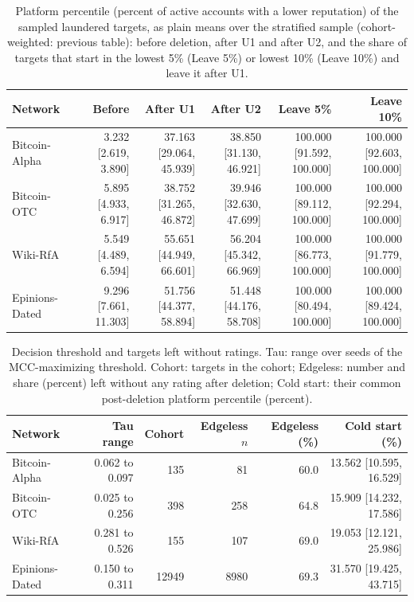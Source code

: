 \begin{table}[!t]
\centering
\scriptsize
\setlength{\tabcolsep}{3pt}
\caption{Platform percentile (percent of active accounts with a lower reputation) of the sampled laundered targets, as plain means over the stratified sample (cohort-weighted: previous table): before deletion, after U1 and after U2, and the share of targets that start in the lowest 5\% (Leave 5\%) or lowest 10\% (Leave 10\%) and leave it after U1.}
\label{tab:s_s_percentiles_percentile}
\begin{tabular}{@{}lrrrrr@{}}
\toprule
\textbf{Network} & \textbf{Before} & \textbf{After U1} & \textbf{After U2} & \textbf{Leave 5\%} & \textbf{Leave 10\%} \\
\midrule
Bitcoin-Alpha & 3.232 [2.619, 3.890] & 37.163 [29.064, 45.939] & 38.850 [31.130, 46.921] & 100.000 [91.592, 100.000] & 100.000 [92.603, 100.000] \\
Bitcoin-OTC & 5.895 [4.933, 6.917] & 38.752 [31.265, 46.872] & 39.946 [32.630, 47.699] & 100.000 [89.112, 100.000] & 100.000 [92.294, 100.000] \\
Wiki-RfA & 5.549 [4.489, 6.594] & 55.651 [44.949, 66.601] & 56.204 [45.342, 66.969] & 100.000 [86.773, 100.000] & 100.000 [91.779, 100.000] \\
Epinions-Dated & 9.296 [7.661, 11.303] & 51.756 [44.377, 58.894] & 51.448 [44.176, 58.708] & 100.000 [80.494, 100.000] & 100.000 [89.424, 100.000] \\
\bottomrule
\end{tabular}
\end{table}

\begin{table}[!t]
\centering
\scriptsize
\setlength{\tabcolsep}{3pt}
\caption{Decision threshold and targets left without ratings. Tau: range over seeds of the MCC-maximizing threshold. Cohort: targets in the cohort; Edgeless: number and share (percent) left without any rating after deletion; Cold start: their common post-deletion platform percentile (percent).}
\label{tab:s_s_percentiles_edgeless}
\begin{tabular}{@{}lrrrrr@{}}
\toprule
\textbf{Network} & \textbf{Tau range} & \textbf{Cohort} & \textbf{Edgeless $n$} & \textbf{Edgeless (\%)} & \textbf{Cold start (\%)} \\
\midrule
Bitcoin-Alpha & 0.062 to 0.097 & 135 & 81 & 60.0 & 13.562 [10.595, 16.529] \\
Bitcoin-OTC & 0.025 to 0.256 & 398 & 258 & 64.8 & 15.909 [14.232, 17.586] \\
Wiki-RfA & 0.281 to 0.526 & 155 & 107 & 69.0 & 19.053 [12.121, 25.986] \\
Epinions-Dated & 0.150 to 0.311 & 12949 & 8980 & 69.3 & 31.570 [19.425, 43.715] \\
\bottomrule
\end{tabular}
\end{table}
